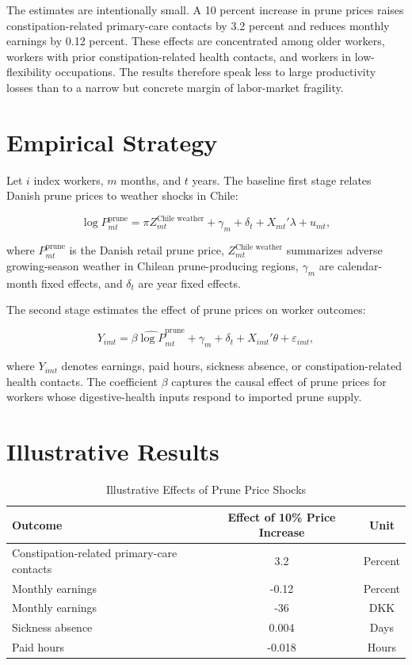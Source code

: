 \documentclass[12pt]{article}
\begin{document}
The estimates are intentionally small. A 10 percent increase in prune prices raises constipation-related primary-care contacts by 3.2 percent and reduces monthly earnings by 0.12 percent. These effects are concentrated among older workers, workers with prior constipation-related health contacts, and workers in low-flexibility occupations. The results therefore speak less to large productivity losses than to a narrow but concrete margin of labor-market fragility.

\section{Empirical Strategy}

Let $i$ index workers, $m$ months, and $t$ years. The baseline first stage relates Danish prune prices to weather shocks in Chile:

\begin{equation}
  \log P_{mt}^{\text{prune}} =
  \pi Z_{mt}^{\text{Chile weather}} + \gamma_m + \delta_t + X_{mt}'\lambda + u_{mt},
\end{equation}

\noindent
where $P_{mt}^{\text{prune}}$ is the Danish retail prune price, $Z_{mt}^{\text{Chile weather}}$ summarizes adverse growing-season weather in Chilean prune-producing regions, $\gamma_m$ are calendar-month fixed effects, and $\delta_t$ are year fixed effects.

The second stage estimates the effect of prune prices on worker outcomes:

\begin{equation}
  Y_{imt} =
  \beta \widehat{\log P}_{mt}^{\text{prune}} + \gamma_m + \delta_t + X_{imt}'\theta + \varepsilon_{imt},
\end{equation}

\noindent
where $Y_{imt}$ denotes earnings, paid hours, sickness absence, or constipation-related health contacts. The coefficient $\beta$ captures the causal effect of prune prices for workers whose digestive-health inputs respond to imported prune supply.

\section{Illustrative Results}

\begin{table}[h!]
\centering
\caption{Illustrative Effects of Prune Price Shocks}
\begin{tabular}{lcc}
\toprule
Outcome & Effect of 10\% Price Increase & Unit \\
\midrule
Constipation-related primary-care contacts & 3.2 & Percent \\
Monthly earnings & -0.12 & Percent \\
Monthly earnings & -36 & DKK \\
Sickness absence & 0.004 & Days \\
Paid hours & -0.018 & Hours \\
\bottomrule
\end{tabular}
\end{table}
\end{document}
